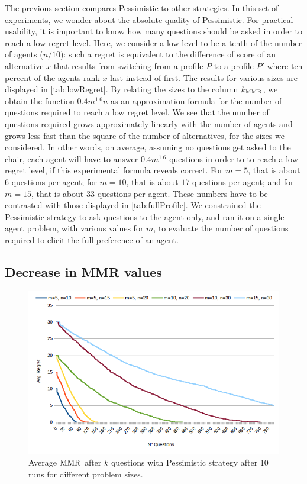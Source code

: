 \documentclass[sigconf, anonymous]{aamas}
\begin{document}
The previous section compares Pessimistic to other strategies. In this set of experiments, we wonder about the absolute quality of Pessimistic. For practical usability, it is important to know how many questions should be asked in order to reach a low regret level. Here, we consider a low level to be a tenth of the number of agents ($n/10$): such a regret is equivalent to the difference of score of an alternative $x$ that results from switching from a profile $P$ to a profile $P'$ where ten percent of the agents rank $x$ last instead of first.
The results for various sizes are displayed in \cref{tab:lowRegret}. 
By relating the sizes to the column $k_{\operatorname{MMR}}$, we obtain the function $0.4m^{1.6}n$ as an approximation formula for the number of questions required to reach a low regret level. We see that the number of questions required grows approximately linearly with the number of agents and grows less fast than the square of the number of alternatives, for the sizes we considered. In other words, on average, assuming no questions get asked to the chair, each agent will have to answer $0.4m^{1.6}$ questions in order to to reach a low regret level, if this experimental formula reveals correct. For $m = 5$, that is about $6$ questions per agent; for $m = 10$, that is about $17$ questions per agent; and for $m = 15$, that is about $33$ questions per agent. These numbers have to be contrasted with those displayed in \cref{tab:fullProfile}. We constrained the Pessimistic strategy to ask questions to the agent only, and ran it on a single agent problem, with various values for $m$, to evaluate the number of questions required to elicit the full preference of an agent.

\subsection{Decrease in MMR values}
\begin{figure}
	\centering
	\includegraphics[width=.45\textwidth]{linearity.png}
	\caption{Average $\operatorname{MMR}$ after $k$ questions with Pessimistic strategy after 10 runs for different problem sizes.}
	\label{fig:linearity}
\end{figure}
\end{document}
